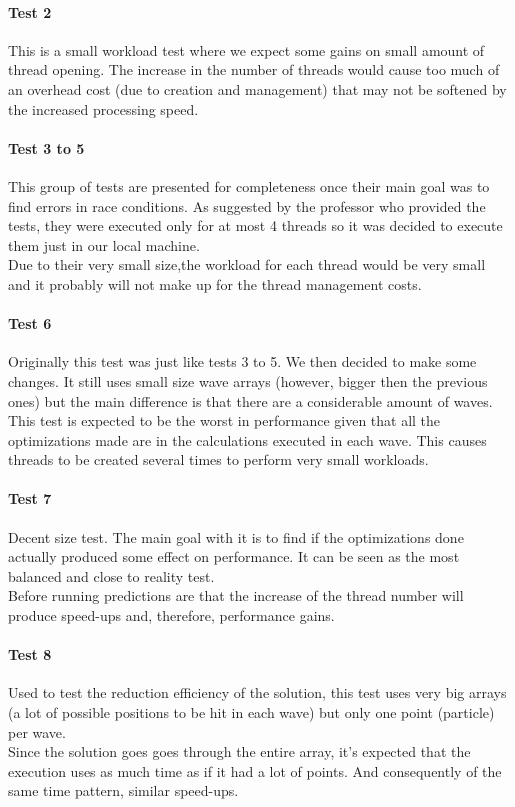 \documentclass[10pt,journal,compsoc]{IEEEtran}
\begin{document}
\paragraph*{\textbf{Test 2}}
This is a small workload test where we expect some gains on small amount of thread opening. The increase in the number of threads would cause too much of an overhead cost (due to creation and management) that may not be softened by the increased processing speed.

\paragraph*{\textbf{Test 3 to 5}}
This group of tests are presented for completeness once their main goal was to find errors in race conditions. As suggested by the professor who provided the tests, they were executed only for at most 4 threads so it was decided to execute them just in our local machine.  
\\
Due to their very small size,the workload for each thread would be very small and it probably will not make up for the thread management costs.

\paragraph*{\textbf{Test 6}}
Originally this test was just like tests 3 to 5. We then decided to make some changes. It still uses small size wave arrays (however, bigger then the previous ones) but the main difference is that there are a considerable amount of waves.
\\
This test is expected to be the worst in performance given that all the optimizations made are in the calculations executed in each wave. This causes threads to be created several times to perform very small workloads.

\paragraph*{\textbf{Test 7}}
Decent size test. The main goal with it is to find if the optimizations done actually produced some effect on performance. It can be seen as the most balanced and close to reality test.\\
Before running predictions are that the increase of the thread number will produce speed-ups and, therefore, performance gains.

\paragraph*{\textbf{Test 8}}
Used to test the reduction efficiency of the solution, this test uses very big arrays (a lot of possible positions to be hit in each wave) but only one point (particle) per wave.
\\
Since the solution goes goes through the entire array, it's expected that the execution uses as much time as if it had a lot of points. And consequently of the same time pattern, similar speed-ups.
\end{document}
